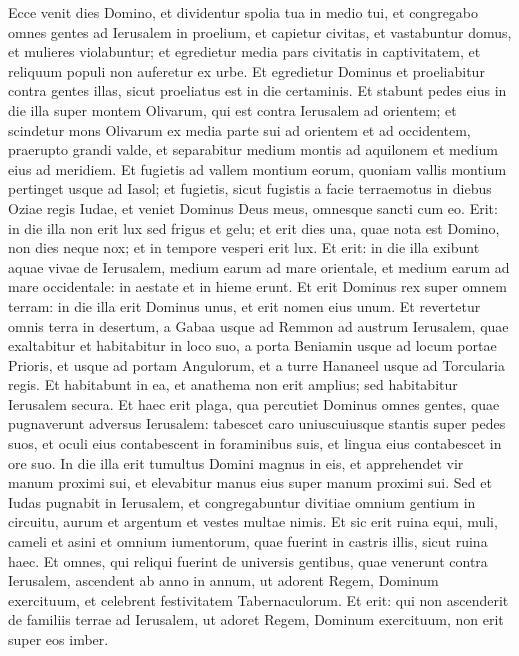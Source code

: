 \begin{biblechapter}
\begin{biblechapter}
\begin{biblechapter}
\begin{biblechapter}
\begin{biblechapter}
\begin{biblechapter}
\begin{biblechapter}
\begin{biblechapter}
\begin{biblechapter}
\begin{biblechapter}
\begin{biblechapter}
\begin{biblechapter}
\begin{biblechapter}
\begin{biblechapter}
\verse Ecce venit dies Domino, et dividentur spolia tua in medio tui, 
\verse et congregabo omnes gentes ad Ierusalem in proelium, et capietur civitas, et vastabuntur domus, et mulieres violabuntur; et egredietur media pars civitatis in captivitatem, et reliquum populi non auferetur ex urbe. 
\verse Et egredietur Dominus et proeliabitur contra gentes illas, sicut proeliatus est in die certaminis. 
\verse Et stabunt pedes eius in die illa super montem Olivarum, qui est contra Ierusalem ad orientem; et scindetur mons Olivarum ex media parte sui ad orientem et ad occidentem, praerupto grandi valde, et separabitur medium montis ad aquilonem et medium eius ad meridiem. 
\verse Et fugietis ad vallem montium eorum, quoniam vallis montium pertinget usque ad Iasol; et fugietis, sicut fugistis a facie terraemotus in diebus Oziae regis Iudae, et veniet Dominus Deus meus, omnesque sancti cum eo.
 \verse Erit: in die illa non erit lux sed frigus et gelu; 
\verse et erit dies una, quae nota est Domino, non dies neque nox; et in tempore vesperi erit lux. 
\verse Et erit: in die illa exibunt aquae vivae de Ierusalem, medium earum ad mare orientale, et medium earum ad mare occidentale: in aestate et in hieme erunt. 
 \verse Et erit Dominus rex super omnem terram: in die illa erit Dominus unus, et erit nomen eius unum.
 \verse Et revertetur omnis terra in desertum, a Gabaa usque ad Remmon ad austrum Ierusalem, quae exaltabitur et habitabitur in loco suo, a porta Beniamin usque ad locum portae Prioris, et usque ad portam Angulorum, et a turre Hananeel usque ad Torcularia regis. 
\verse Et habitabunt in ea, et anathema non erit amplius; sed habitabitur Ierusalem secura.
 \verse Et haec erit plaga, qua percutiet Dominus omnes gentes, quae pugnaverunt adversus Ierusalem: tabescet caro uniuscuiusque stantis super pedes suos, et oculi eius contabescent in foraminibus suis, et lingua eius contabescet in ore suo. 
\verse In die illa erit tumultus Domini magnus in eis, et apprehendet vir manum proximi sui, et elevabitur manus eius super manum proximi sui. 
\verse Sed et Iudas pugnabit in Ierusalem, et congregabuntur divitiae omnium gentium in circuitu, aurum et argentum et vestes multae nimis. 
\verse Et sic erit ruina equi, muli, cameli et asini et omnium iumentorum, quae fuerint in castris illis, sicut ruina haec.
 \verse Et omnes, qui reliqui fuerint de universis gentibus, quae venerunt contra Ierusalem, ascendent ab anno in annum, ut adorent Regem, Dominum exercituum, et celebrent festivitatem Tabernaculorum. 
\verse Et erit: qui non ascenderit de familiis terrae ad Ierusalem, ut adoret Regem, Dominum exercituum, non erit super eos imber. 

\end{biblechapter}
\end{biblechapter}
\end{biblechapter}
\end{biblechapter}
\end{biblechapter}
\end{biblechapter}
\end{biblechapter}
\end{biblechapter}
\end{biblechapter}
\end{biblechapter}
\end{biblechapter}
\end{biblechapter}
\end{biblechapter}
\end{biblechapter}
